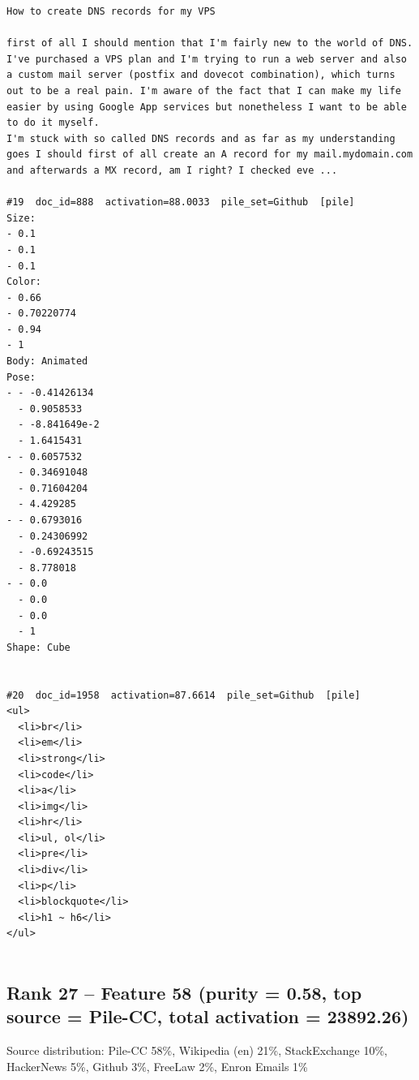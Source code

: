 \begin{verbatim}
How to create DNS records for my VPS

first of all I should mention that I'm fairly new to the world of DNS. I've purchased a VPS plan and I'm trying to run a web server and also a custom mail server (postfix and dovecot combination), which turns out to be a real pain. I'm aware of the fact that I can make my life easier by using Google App services but nonetheless I want to be able to do it myself. 
I'm stuck with so called DNS records and as far as my understanding goes I should first of all create an A record for my mail.mydomain.com and afterwards a MX record, am I right? I checked eve ...

#19  doc_id=888  activation=88.0033  pile_set=Github  [pile]
Size:
- 0.1
- 0.1
- 0.1
Color:
- 0.66
- 0.70220774
- 0.94
- 1
Body: Animated
Pose:
- - -0.41426134
  - 0.9058533
  - -8.841649e-2
  - 1.6415431
- - 0.6057532
  - 0.34691048
  - 0.71604204
  - 4.429285
- - 0.6793016
  - 0.24306992
  - -0.69243515
  - 8.778018
- - 0.0
  - 0.0
  - 0.0
  - 1
Shape: Cube


#20  doc_id=1958  activation=87.6614  pile_set=Github  [pile]
<ul>
  <li>br</li>
  <li>em</li>
  <li>strong</li>
  <li>code</li>
  <li>a</li>
  <li>img</li>
  <li>hr</li>
  <li>ul, ol</li>
  <li>pre</li>
  <li>div</li>
  <li>p</li>
  <li>blockquote</li>
  <li>h1 ~ h6</li>
</ul>


\end{verbatim}

\subsection*{Rank 27 -- Feature 58 (purity = 0.58, top source = Pile-CC, total activation = 23892.26)}

Source distribution: Pile-CC 58\%, Wikipedia (en) 21\%, StackExchange 10\%, HackerNews 5\%, Github 3\%, FreeLaw 2\%, Enron Emails 1\%

